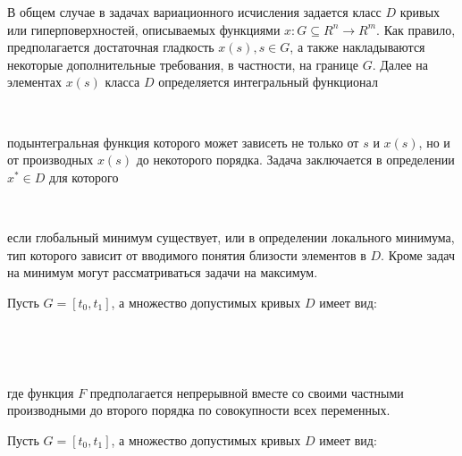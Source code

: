 
\graphicspath{ {imgs/} }






В общем случае в задачах вариационного исчисления задается класс $D$ кривых или гиперповерхностей, описываемых функциями $x : G \subseteq R^n → R^m.$ Как правило, предполагается достаточная гладкость $x(s), s \in G$, а также накладываются некоторые дополнительные требования, в частности, на границе $G$. Далее на элементах $x(s)$ класса $D$ определяется интегральный функционал 

\

подынтегральная функция которого может зависеть не только от $s$ и $x(s)$, но и от производных $x(s)$ до некоторого порядка. Задача заключается в определении $x^* \in D$ для которого

\

если глобальный минимум существует, или в определении локального минимума, тип которого зависит от вводимого понятия близости элементов в $D$. Кроме задач на минимум могут рассматриваться задачи на максимум.



Пусть $G = [t_0, t_1]$, а множество допустимых кривых $D$ имеет вид:

\

\

где функция $F$ предполагается непрерывной вместе со своими частными производными до второго порядка по совокупности всех переменных.


Пусть $G = [t_0, t_1]$, а множество допустимых кривых $D$ имеет вид:

\

